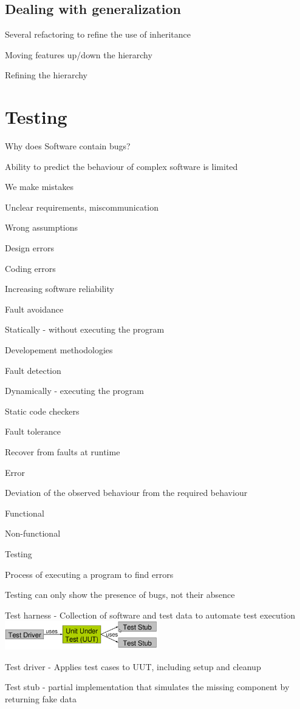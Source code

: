 \documentclass[10pt]{article}
\begin{document}
\subsection{Dealing with generalization}
\enumstart
	\item Several refactoring to refine the use of inheritance
	\item Moving features up/down the hierarchy
	\item Refining the hierarchy
\enumend

\section{Testing}
\enumstart
	\item Why does Software contain bugs?
	\enumstart
		\item Ability to predict the behaviour of complex software is limited
		\item We make mistakes
		\enumstart
			\item Unclear requirements, miscommunication
			\item Wrong assumptions
			\item Design errors
			\item Coding errors
		\enumend
	\enumend
	\item Increasing software reliability
	\enumstart
		\item Fault avoidance
		\enumstart
			\item Statically - without executing the program
			\item Developement methodologies
		\enumend
		\item Fault detection
		\enumstart
			\item Dynamically - executing the program
			\item Static code checkers
		\enumend
		\item Fault tolerance
		\enumstart
			\item Recover from faults at runtime
		\enumend
	\enumend
	\item Error
	\enumstart
		\item Deviation of the observed behaviour from the required behaviour
		\item Functional
		\item Non-functional
	\enumend
	\item Testing
	\enumstart
		\item Process of executing a program to find errors
		\item Testing can only show the presence of bugs, not their absence
	\enumend
	\item Test harness - Collection of software and test data to automate test execution
	\\ \includegraphics[width=0.5\textwidth]{test_harness.png}
	\enumstart
		\item Test driver - Applies test cases to UUT, including setup and cleanup
		\item Test stub - partial implementation that simulates the missing component by returning fake data
	\enumend
\enumend
\end{document}
